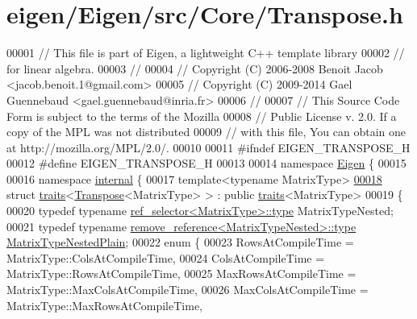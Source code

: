 \hypertarget{eigen_2_eigen_2src_2_core_2_transpose_8h_source}{}\section{eigen/\+Eigen/src/\+Core/\+Transpose.h}
\label{eigen_2_eigen_2src_2_core_2_transpose_8h_source}

\begin{DoxyCode}
00001 \textcolor{comment}{// This file is part of Eigen, a lightweight C++ template library}
00002 \textcolor{comment}{// for linear algebra.}
00003 \textcolor{comment}{//}
00004 \textcolor{comment}{// Copyright (C) 2006-2008 Benoit Jacob <jacob.benoit.1@gmail.com>}
00005 \textcolor{comment}{// Copyright (C) 2009-2014 Gael Guennebaud <gael.guennebaud@inria.fr>}
00006 \textcolor{comment}{//}
00007 \textcolor{comment}{// This Source Code Form is subject to the terms of the Mozilla}
00008 \textcolor{comment}{// Public License v. 2.0. If a copy of the MPL was not distributed}
00009 \textcolor{comment}{// with this file, You can obtain one at http://mozilla.org/MPL/2.0/.}
00010 
00011 \textcolor{preprocessor}{#ifndef EIGEN\_TRANSPOSE\_H}
00012 \textcolor{preprocessor}{#define EIGEN\_TRANSPOSE\_H}
00013 
00014 \textcolor{keyword}{namespace }\hyperlink{namespace_eigen}{Eigen} \{ 
00015 
00016 \textcolor{keyword}{namespace }\hyperlink{namespaceinternal}{internal} \{
00017 \textcolor{keyword}{template}<\textcolor{keyword}{typename} MatrixType>
\hyperlink{struct_eigen_1_1internal_1_1traits_3_01_transpose_3_01_matrix_type_01_4_01_4}{00018} \textcolor{keyword}{struct }\hyperlink{struct_eigen_1_1internal_1_1traits}{traits}<\hyperlink{group___core___module_class_eigen_1_1_transpose}{Transpose}<MatrixType> > : \textcolor{keyword}{public} \hyperlink{struct_eigen_1_1internal_1_1traits}{traits}<MatrixType>
00019 \{
00020   \textcolor{keyword}{typedef} \textcolor{keyword}{typename} \hyperlink{struct_eigen_1_1internal_1_1ref__selector}{ref\_selector<MatrixType>::type} MatrixTypeNested;
00021   \textcolor{keyword}{typedef} \textcolor{keyword}{typename} \hyperlink{group___sparse_core___module}{remove\_reference<MatrixTypeNested>::type} 
      \hyperlink{group___sparse_core___module}{MatrixTypeNestedPlain};
00022   \textcolor{keyword}{enum} \{
00023     RowsAtCompileTime = MatrixType::ColsAtCompileTime,
00024     ColsAtCompileTime = MatrixType::RowsAtCompileTime,
00025     MaxRowsAtCompileTime = MatrixType::MaxColsAtCompileTime,
00026     MaxColsAtCompileTime = MatrixType::MaxRowsAtCompileTime,

\end{DoxyCode}
